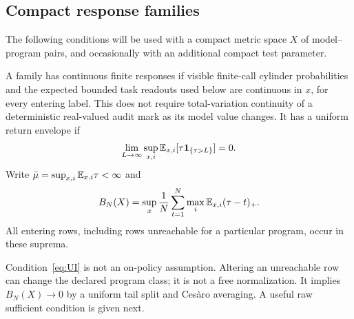 \subsection{Compact response families}
The following conditions will be used with a compact metric space $X$ of model--program pairs, and occasionally with an additional compact test parameter.

\begin{definition}\label{def:responses}
A family has continuous finite responses if visible finite-call cylinder probabilities and the expected bounded task readouts used below are continuous in $x$, for every entering label. This does not require total-variation continuity of a deterministic real-valued audit mark as its model value changes. It has a uniform return envelope if
\begin{equation}\label{eq:UI}
 \lim_{L\to\infty}\sup_{x,i}\mathbb E_{x,i}[\tau\mathbf 1_{\{\tau>L\}}]=0.
\end{equation}
Write $\bar\mu=\sup_{x,i}\mathbb E_{x,i}\tau<\infty$ and
\begin{equation}\label{eq:tail-def}
 B_N(X)=\sup_x\frac1N\sum_{t=1}^N\max_i\mathbb E_{x,i}(\tau-t)_+.
\end{equation}
All entering rows, including rows unreachable for a particular program, occur in these suprema.
\end{definition}
Condition~\eqref{eq:UI} is not an on-policy assumption. Altering an unreachable row can change the declared program class; it is not a free normalization. It implies $B_N(X)\to0$ by a uniform tail split and Ces\`aro averaging. A useful raw sufficient condition is given next.

